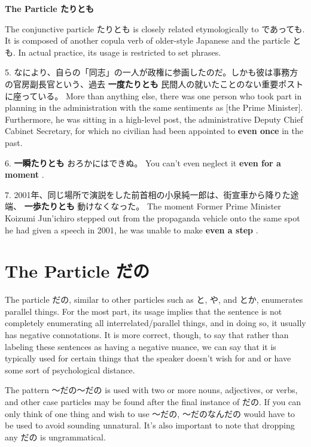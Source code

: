\begin{center}
\textbf{The Particle たりとも }
\end{center}
 
\par{ The conjunctive particle たりとも is closely related etymologically to であっても. It is composed of another copula verb of older-style Japanese and the particle とも. In actual practice, its usage is restricted to set phrases. }

\par{5. なにより、自らの「同志」の一人が政権に参画したのだ。しかも彼は事務方の官房副長官という、過去 \textbf{一度たりとも }民間人の就いたことのない重要ポストに座っている。 \hfill\break
More than anything else, there was one person who took part in planning in the administration with the same sentiments as [the Prime Minister]. Furthermore, he was sitting in a high-level post, the administrative Deputy Chief Cabinet Secretary, for which no civilian had been appointed to \textbf{even once }in the past. }

\par{6. \textbf{一瞬たりとも }おろかにはできぬ。 \hfill\break
You can't even neglect it \textbf{even for a moment }. }

\par{7. 2001年、同じ場所で演説をした前首相の小泉純一郎は、街宣車から降りた途端、 \textbf{一歩たりとも }動けなくなった。 \hfill\break
The moment Former Prime Minister Koizumi Jun'ichiro stepped out from the propaganda vehicle onto the same spot he had given a speech in 2001, he was unable to make \textbf{even a step }. }
      
\section{The Particle だの}
 
\par{ The particle だの, similar to other particles such as と, や, and とか, enumerates parallel things. For the most part, its usage implies that the sentence is not completely enumerating all interrelated\slash parallel things, and in doing so, it usually has negative connotations. It is more correct, though, to say that rather than labeling these sentences as having a negative nuance, we can say that it is typically used for certain things that the speaker doesn't wish for and or have some sort of psychological distance. }
 
\par{The pattern ～だの～だの is used with two or more nouns, adjectives, or verbs, and other case particles may be found after the final instance of だの. If you can only think of one thing and wish to use ～だの, ～だのなんだの would have to be used to avoid sounding unnatural. It's also important to note that dropping any だの is ungrammatical. }

